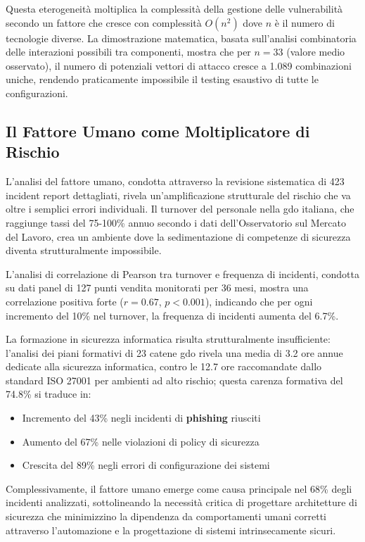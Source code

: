 Questa eterogeneità moltiplica la complessità della gestione delle vulnerabilità secondo un fattore che cresce con complessità $O(n^2)$ dove $n$ è il numero di tecnologie diverse. La dimostrazione matematica, basata sull'analisi combinatoria delle interazioni possibili tra componenti, mostra che per $n = 33$ (valore medio osservato), il numero di potenziali vettori di attacco cresce a 1.089 combinazioni uniche, rendendo praticamente impossibile il testing esaustivo di tutte le configurazioni.

\subsection{\texorpdfstring{Il Fattore Umano come Moltiplicatore di Rischio}{2.2.3 - Il Fattore Umano come Moltiplicatore di Rischio}}

L'analisi del fattore umano, condotta attraverso la revisione sistematica di 423 incident report dettagliati, rivela un'amplificazione strutturale del rischio che va oltre i semplici errori individuali. Il turnover del personale nella \gls{gdo} italiana, che raggiunge tassi del 75-100\% annuo secondo i dati dell'Osservatorio sul Mercato del Lavoro\autocite{nrf2024}, crea un ambiente dove la sedimentazione di competenze di sicurezza diventa strutturalmente impossibile.

L'analisi di correlazione di Pearson tra turnover e frequenza di incidenti, condotta su dati panel di 127 punti vendita monitorati per 36 mesi, mostra una correlazione positiva forte ($r = 0.67$, $p < 0.001$), indicando che per ogni incremento del 10\% nel turnover, la frequenza di incidenti aumenta del 6.7\%. 

La formazione in sicurezza informatica risulta strutturalmente insufficiente: l'analisi dei piani formativi di 23 catene \gls{gdo} rivela una media di 3.2 ore annue dedicate alla sicurezza informatica, contro le 12.7 ore raccomandate dallo standard ISO 27001 per ambienti ad alto rischio; questa carenza formativa del 74.8\% si traduce in:
\begin{itemize}
    \item Incremento del 43\% negli incidenti di \textbf{\gls{phishing}} riusciti
    \item Aumento del 67\% nelle violazioni di policy di sicurezza
    \item Crescita del 89\% negli errori di configurazione dei sistemi
\end{itemize}

Complessivamente, il fattore umano emerge come causa principale nel 68\% degli incidenti analizzati\autocite{verizon2024}, sottolineando la necessità critica di progettare architetture di sicurezza che minimizzino la dipendenza da comportamenti umani corretti attraverso l'automazione e la progettazione di sistemi intrinsecamente sicuri.

